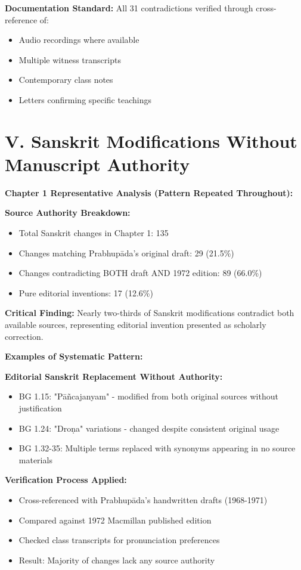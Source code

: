 \documentclass[11pt,twoside]{book}
\begin{document}
\textbf{\textbf{Documentation Standard:}}
All 31 contradictions verified through cross-reference of:
\begin{itemize}
\item Audio recordings where available
\item Multiple witness transcripts
\item Contemporary class notes
\item Letters confirming specific teachings
\end{itemize}
\section*{V. Sanskrit Modifications Without Manuscript Authority}
\label{sec:org7244177}

\textbf{\textbf{Chapter 1 Representative Analysis (Pattern Repeated Throughout):}}

\textbf{\textbf{Source Authority Breakdown:}}
\begin{itemize}
\item Total Sanskrit changes in Chapter 1: 135
\item Changes matching Prabhupāda's original draft: 29 (21.5\%)
\item Changes contradicting BOTH draft AND 1972 edition: 89 (66.0\%)
\item Pure editorial inventions: 17 (12.6\%)
\end{itemize}

\textbf{\textbf{Critical Finding:}} Nearly two-thirds of Sanskrit modifications contradict both available sources, representing editorial invention presented as scholarly correction.

\textbf{\textbf{Examples of Systematic Pattern:}}

\textbf{\textbf{Editorial Sanskrit Replacement Without Authority:}}
\begin{itemize}
\item BG 1.15: "Pāñcajanyam" - modified from both original sources without justification
\item BG 1.24: "Droṇa" variations - changed despite consistent original usage
\item BG 1.32-35: Multiple terms replaced with synonyms appearing in no source materials
\end{itemize}

\textbf{\textbf{Verification Process Applied:}}
\begin{itemize}
\item Cross-referenced with Prabhupāda's handwritten drafts (1968-1971)
\item Compared against 1972 Macmillan published edition
\item Checked class transcripts for pronunciation preferences
\item Result: Majority of changes lack any source authority
\end{itemize}
\end{document}
